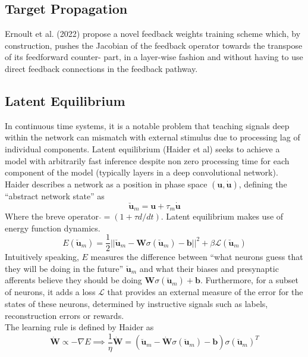 \documentclass[11pt, a4paper]{article}
\begin{document}
\subsection{Target Propagation}
Ernoult et al. (2022) propose a novel feedback weights training scheme
which, by construction, pushes the Jacobian of the feedback operator towards the transpose of its feedforward counter- part, in a layer-wise fashion and without having to use direct feedback connections in the feedback pathway.




\subsection{Latent Equilibrium}
In continuous time systems, it is a notable problem that teaching signals deep within the network can mismatch with external stimulus due to processing lag of individual components. Latent equilibrium (Haider et al) seeks to achieve a model with arbitrarily fast inference despite non zero processing time for each component of the model (typically layers in a deep convolutional network). Haider describes a network as a position in phase space $(\mathbf{u}, \mathbf{\dot{u}})$, defining the ``abstract network state'' as
\begin{equation}
    \mathbf{\breve{u}}_m = \mathbf{u} + \tau_m \mathbf{\dot{u}}
\end{equation}
Where the breve operator $\breve{} = (1+\tau d/dt)$. Latent equilibrium makes use of energy function dynamics.
\begin{equation}
    E(\mathbf{\breve{u}}_m) = \frac{1}{2}||\mathbf{\breve{u}}_m - \mathbf{W}\sigma(\mathbf{\breve{u}}_m) - \mathbf{b}||^2 + \beta\mathcal{L}(\mathbf{\breve{u}}_m)
\end{equation}
Intuitively speaking, $E$ measures the difference between “what neurons guess that they will be doing in the future” $\mathbf{\breve{u}}_m$ and what their biases and presynaptic afferents believe they should be doing $\mathbf{W}\sigma(\mathbf{\breve{u}}_m) + \mathbf{b}$. Furthermore, for a subset of neurons, it adds a loss $\mathcal{L}$ that provides an external measure of the error for the states of these neurons, determined by instructive signals such as labels, reconstruction errors or rewards.  \\

The learning rule is defined by Haider as
\begin{equation}
    \mathbf{\dot{W}} \propto -\nabla E \implies \frac{1}{\eta}\mathbf{\dot{W}} = (\mathbf{\breve{u}}_m - \mathbf{\dot{W}}\sigma(\mathbf{\breve{u}}_m) - \mathbf{b}) \sigma(\mathbf{\breve{u}}_m)^T
\end{equation}
\end{document}
